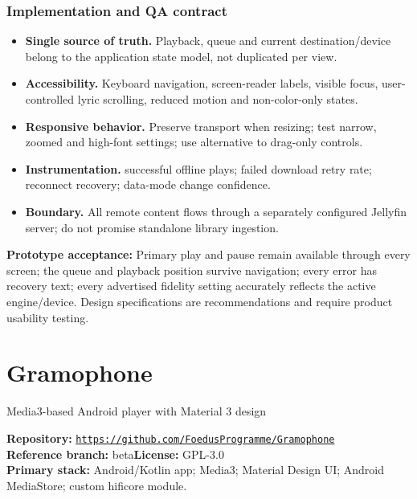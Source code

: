 \documentclass[10pt,a4paper,oneside]{report}
\newcommand{\sourceurl}[1]{\href{#1}{\texttt{\nolinkurl{#1}}}}
\begin{document}
\subsection*{Implementation and QA contract}
\begin{itemize}[leftmargin=*,itemsep=2pt,topsep=2pt]
\item \textbf{Single source of truth.} Playback, queue and current destination/device belong to the application state model, not duplicated per view.
\item \textbf{Accessibility.} Keyboard navigation, screen-reader labels, visible focus, user-controlled lyric scrolling, reduced motion and non-color-only states.
\item \textbf{Responsive behavior.} Preserve transport when resizing; test narrow, zoomed and high-font settings; use alternative to drag-only controls.
\item \textbf{Instrumentation.} successful offline plays; failed download retry rate; reconnect recovery; data-mode change confidence.
\item \textbf{Boundary.} All remote content flows through a separately configured Jellyfin server; do not promise standalone library ingestion.
\end{itemize}
\vspace{2mm}\begin{evidencebox}\small\textbf{Prototype acceptance:} Primary play and pause remain available through every screen; the queue and playback position survive navigation; every error has recovery text; every advertised fidelity setting accurately reflects the active engine/device. Design specifications are recommendations and require product usability testing.\end{evidencebox}
\clearpage
\chapter{Gramophone}
{\large\color{muted}Media3-based Android player with Material 3 design}\par
\begin{evidencebox}\small\textbf{Repository:} \sourceurl{https://github.com/FoedusProgramme/Gramophone}\\\textbf{Reference branch:} beta\qquad \textbf{License:} GPL-3.0\\\textbf{Primary stack:} Android/Kotlin app; Media3; Material Design UI; Android MediaStore; custom hificore module.\end{evidencebox}
\end{document}
